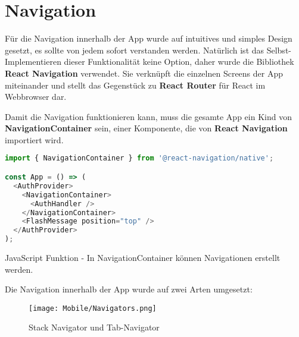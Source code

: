 \chapter{Navigation}
Für die Navigation innerhalb der App wurde auf intuitives und simples Design gesetzt, es sollte von
jedem sofort verstanden werden. Natürlich ist das Selbst-Implementieren dieser Funktionalität keine
Option, daher wurde die Bibliothek \textbf{React Navigation} verwendet. Sie verknüpft die einzelnen
Screens der App miteinander und stellt das Gegenstück zu \textbf{React Router} für React im
Webbrowser dar.

Damit die Navigation funktionieren kann, muss die gesamte App ein Kind von
\textbf{NavigationContainer} sein, einer Komponente, die von \textbf{React Navigation} importiert
wird.

\begin{code}[htp]
\begin{lstlisting}[firstnumber=1,language=JavaScript, style=JSX]
import { NavigationContainer } from '@react-navigation/native';

const App = () => (
  <AuthProvider>
    <NavigationContainer>
      <AuthHandler />
    </NavigationContainer>
    <FlashMessage position="top" />
  </AuthProvider>
);
\end{lstlisting}
\caption{JavaScript Funktion - In NavigationContainer können Navigationen erstellt werden.}
\end{code}

Die Navigation innerhalb der App wurde auf zwei Arten umgesetzt:

\begin{figure}[H]
  \begin{center}
    \texttt{[image: Mobile/Navigators.png]}
    \caption{Stack Navigator und Tab-Navigator}
  \end{center}
\end{figure}

\newpage


\newpage

